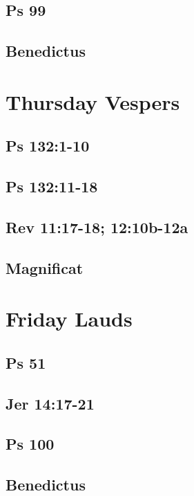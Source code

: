 \subsection{Ps 99}

\subsection{Benedictus}


\section{Thursday Vespers}

\subsection{Ps 132:1-10}

\subsection{Ps 132:11-18}

\subsection{Rev 11:17-18; 12:10b-12a}

\subsection{Magnificat}


\section{Friday Lauds}

\subsection{Ps 51}

\subsection{Jer 14:17-21}

\subsection{Ps 100}

\subsection{Benedictus}


